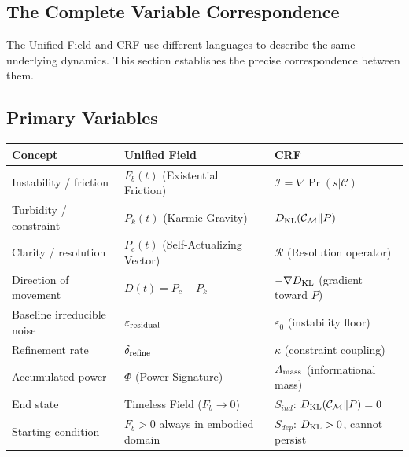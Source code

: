 \documentclass[12pt, a4paper]{article}
\begin{document}
\subsection*{The Complete Variable Correspondence}

The Unified Field and CRF use different languages to describe the same underlying
dynamics. This section establishes the precise correspondence between them.

\subsection{Primary Variables}

\begin{formalbox}[title={Unified Field $\leftrightarrow$ CRF: Core Variables}]
\begin{center}
\renewcommand{\arraystretch}{1.5}
\begin{tabular}{p{3.5cm} p{4cm} p{4cm}}
\toprule
\textbf{Concept} & \textbf{Unified Field} & \textbf{CRF} \\
\midrule
Instability / friction &
  $F_b(t)$ (Existential Friction) &
  $\mathcal{I} = \nabla\Pr(s|\mathcal{C})$ \\
Turbidity / constraint &
  $P_k(t)$ (Karmic Gravity) &
  $D_{\rm KL}(\mathcal{C}_\mathcal{M}\|P)$ \\
Clarity / resolution &
  $P_c(t)$ (Self-Actualizing Vector) &
  $\mathcal{R}$ (Resolution operator) \\
Direction of movement &
  $D(t) = P_c - P_k$ &
  $-\nabla D_{\rm KL}$ (gradient toward $P$) \\
Baseline irreducible noise &
  $\varepsilon_{\rm residual}$ &
  $\varepsilon_0$ (instability floor) \\
Refinement rate &
  $\delta_{\rm refine}$ &
  $\kappa$ (constraint coupling) \\
Accumulated power &
  $\Phi$ (Power Signature) &
  $A_{\rm mass}$ (informational mass) \\
End state &
  Timeless Field ($F_b \to 0$) &
  $S_{ind}$: $D_{\rm KL}(\mathcal{C}_\mathcal{M}\|P) = 0$ \\
Starting condition &
  $F_b > 0$ always in embodied domain &
  $S_{dep}$: $D_{\rm KL} > 0$, cannot persist \\
\bottomrule
\end{tabular}
\end{center}
\end{formalbox}
\end{document}
